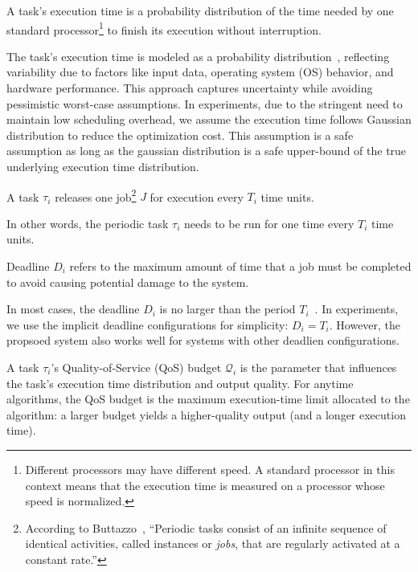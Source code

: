 	
	\begin{definition}
		A task's execution time is a probability distribution of the time needed by one standard processor\footnote{Different processors may have different speed. A standard processor in this context means that the execution time is measured on a processor whose speed is normalized.} to finish its execution without interruption.
	\end{definition}

    The task's execution time is modeled as a probability distribution~\cite{Maxim2013ResponseTA}, reflecting variability due to factors like input data, operating system (OS) behavior, and hardware performance.
    This approach captures uncertainty while avoiding pessimistic worst-case assumptions.
    In experiments, due to the stringent need to maintain low scheduling overhead, we assume the execution time follows Gaussian distribution to reduce the optimization cost. 
	This assumption is a safe assumption as long as the gaussian distribution is a safe upper-bound of the true underlying execution time distribution.

	
	\begin{definition}[Period, $T_i$]
		A task $\tau_i$ releases one job\footnote{According to Buttazzo~\cite{Buttazzo2011HardRC}, ``Periodic tasks consist of an infinite sequence of identical activities, called instances or \textit{jobs}, that are regularly activated at a constant rate.''} $J$ for execution every $T_i$ time units.
	\end{definition}
    In other words, the periodic task $\tau_i$ needs to be run for one time every $T_i$ time units.
	
	\begin{definition}[Deadline, $D_i$]
		Deadline $D_i$ refers to the maximum amount of time that a job must be completed to avoid causing potential damage to the system.
	\end{definition}
	
    In most cases, the deadline $D_i$ is no larger than the period $T_i$~\cite{Buttazzo2011HardRC, Wang2023RTAS}. 
	In experiments, we use the implicit deadline configurations for simplicity: $D_i = T_i$.
	However, the propsoed system also works well for systems with other deadlien configurations.
	
	
	\begin{definition}
		\label{def_task_config}
		A task $\tau_i$'s Quality-of-Service (QoS) budget $\mathcal{Q}_i$ is the parameter that influences the task's execution time distribution and output quality.
		For anytime algorithms, the QoS budget is the maximum execution-time limit allocated to the algorithm: a larger budget yields a higher-quality output (and a longer execution time).
	\end{definition}
	
